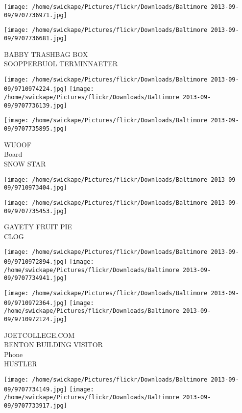 \documentclass[10pt,letterpaper]{article}
\begin{document}
\texttt{[image: /home/swickape/Pictures/flickr/Downloads/Baltimore 2013-09-09/9707736971.jpg]}

\vspace{0.25in}
\texttt{[image: /home/swickape/Pictures/flickr/Downloads/Baltimore 2013-09-09/9707736681.jpg]}

BABBY TRASHBAG BOX\\
SOOPPERBUOL TERMINNAETER
\pagebreak

\texttt{[image: /home/swickape/Pictures/flickr/Downloads/Baltimore 2013-09-09/9710974224.jpg]}
\texttt{[image: /home/swickape/Pictures/flickr/Downloads/Baltimore 2013-09-09/9707736139.jpg]}

\vspace{0.25in}
\texttt{[image: /home/swickape/Pictures/flickr/Downloads/Baltimore 2013-09-09/9707735895.jpg]}

WUOOF\\
Board\\
SNOW STAR
\pagebreak

\texttt{[image: /home/swickape/Pictures/flickr/Downloads/Baltimore 2013-09-09/9710973404.jpg]}

\vspace{0.25in}
\texttt{[image: /home/swickape/Pictures/flickr/Downloads/Baltimore 2013-09-09/9707735453.jpg]}

GAYETY FRUIT PIE\\
CLOG
\pagebreak

\texttt{[image: /home/swickape/Pictures/flickr/Downloads/Baltimore 2013-09-09/9710972894.jpg]}
\texttt{[image: /home/swickape/Pictures/flickr/Downloads/Baltimore 2013-09-09/9707734941.jpg]}

\texttt{[image: /home/swickape/Pictures/flickr/Downloads/Baltimore 2013-09-09/9710972364.jpg]}
\texttt{[image: /home/swickape/Pictures/flickr/Downloads/Baltimore 2013-09-09/9710972124.jpg]}

JOETCOLLEGE.COM\\
BENTON BUILDING VISITOR\\
Phone\\
HUSTLER
\pagebreak

\texttt{[image: /home/swickape/Pictures/flickr/Downloads/Baltimore 2013-09-09/9707734149.jpg]}
\texttt{[image: /home/swickape/Pictures/flickr/Downloads/Baltimore 2013-09-09/9707733917.jpg]}
\end{document}
